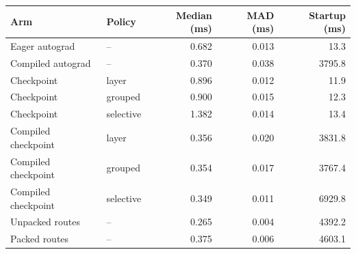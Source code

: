 \begin{tabular}{llrrr}
\toprule
Arm & Policy & Median (ms) & MAD (ms) & Startup (ms) \\
\midrule
Eager autograd & -- & 0.682 & 0.013 & 13.3 \\
Compiled autograd & -- & 0.370 & 0.038 & 3795.8 \\
Checkpoint & layer & 0.896 & 0.012 & 11.9 \\
Checkpoint & grouped & 0.900 & 0.015 & 12.3 \\
Checkpoint & selective & 1.382 & 0.014 & 13.4 \\
Compiled checkpoint & layer & 0.356 & 0.020 & 3831.8 \\
Compiled checkpoint & grouped & 0.354 & 0.017 & 3767.4 \\
Compiled checkpoint & selective & 0.349 & 0.011 & 6929.8 \\
Unpacked routes & -- & 0.265 & 0.004 & 4392.2 \\
Packed routes & -- & 0.375 & 0.006 & 4603.1 \\
\bottomrule
\end{tabular}
